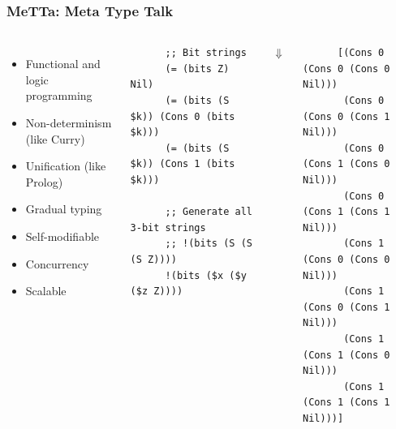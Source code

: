 \documentclass[aspectratio=169]{beamer}
\begin{document}
\begin{frame}[fragile]

  \frametitle{MeTTa: Meta Type Talk}

  \begin{columns}

    \column{7cm}
    \begin{itemize}
    \item Functional and logic programming
    \item Non-determinism (like Curry)
    \item Unification (like Prolog)
    \item Gradual typing
    \item Self-modifiable
    \item Concurrency
    \item Scalable
    \end{itemize}

    \column{7cm}

    \begin{lstlisting}
      ;; Bit strings
      (= (bits Z) Nil)
      (= (bits (S $k)) (Cons 0 (bits $k)))
      (= (bits (S $k)) (Cons 1 (bits $k)))

      ;; Generate all 3-bit strings
      ;; !(bits (S (S (S Z))))
      !(bits ($x ($y ($z Z))))
    \end{lstlisting}

    \begin{center}
      $\Downarrow$
    \end{center}

    \begin{lstlisting}
      [(Cons 0 (Cons 0 (Cons 0 Nil)))
       (Cons 0 (Cons 0 (Cons 1 Nil)))
       (Cons 0 (Cons 1 (Cons 0 Nil)))
       (Cons 0 (Cons 1 (Cons 1 Nil)))
       (Cons 1 (Cons 0 (Cons 0 Nil)))
       (Cons 1 (Cons 0 (Cons 1 Nil)))
       (Cons 1 (Cons 1 (Cons 0 Nil)))
       (Cons 1 (Cons 1 (Cons 1 Nil)))]
    \end{lstlisting}

  \end{columns}

\end{frame}
\end{document}
